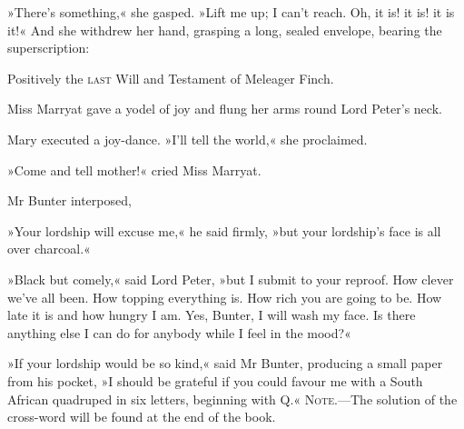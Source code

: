 »There's something,« she gasped. »Lift me up; I can't reach. Oh, it is! it is! it is it!« And she withdrew her hand, grasping a long, sealed envelope, bearing the superscription:

Positively the \textsc{last} Will and Testament of Meleager Finch.

Miss Marryat gave a yodel of joy and flung her arms round Lord Peter's neck.

Mary executed a joy-dance. »I'll tell the world,« she proclaimed.

»Come and tell mother!« cried Miss Marryat.

Mr Bunter interposed,

»Your lordship will excuse me,« he said firmly, »but your lordship's face is all over charcoal.«

»Black but comely,« said Lord Peter, »but I submit to your reproof. How clever we've all been. How topping everything is. How rich you are going to be. How late it is and how hungry I am. Yes, Bunter, I will wash my face. Is there anything else I can do for anybody while I feel in the mood?«

»If your lordship would be so kind,« said Mr Bunter, producing a small paper from his pocket, »I should be grateful if you could favour me with a South African quadruped in six letters, beginning with Q.«
\vfill
\textsc{Note}.—The solution of the cross-word will be found at the end of the book.